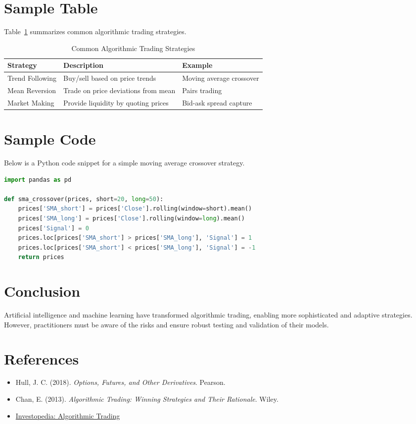 \documentclass[10pt,a4paper]{article} %
\begin{document}
\section{Sample Table}
Table~\ref{tab:strategies} summarizes common algorithmic trading strategies.

\begin{table}[h!]
\centering
\caption{Common Algorithmic Trading Strategies}
\label{tab:strategies}
\begin{tabular}{@{}lll@{}}
\toprule
Strategy & Description & Example \\
\midrule
Trend Following & Buy/sell based on price trends & Moving average crossover \\
Mean Reversion & Trade on price deviations from mean & Pairs trading \\
Market Making & Provide liquidity by quoting prices & Bid-ask spread capture \\
\bottomrule
\end{tabular}
\end{table}

\section{Sample Code}
Below is a Python code snippet for a simple moving average crossover strategy.

\begin{lstlisting}[language=Python, caption={Simple Moving Average Crossover}]
import pandas as pd

def sma_crossover(prices, short=20, long=50):
    prices['SMA_short'] = prices['Close'].rolling(window=short).mean()
    prices['SMA_long'] = prices['Close'].rolling(window=long).mean()
    prices['Signal'] = 0
    prices.loc[prices['SMA_short'] > prices['SMA_long'], 'Signal'] = 1
    prices.loc[prices['SMA_short'] < prices['SMA_long'], 'Signal'] = -1
    return prices
\end{lstlisting}

\section{Conclusion}
Artificial intelligence and machine learning have transformed algorithmic trading, enabling more sophisticated and adaptive strategies. However, practitioners must be aware of the risks and ensure robust testing and validation of their models.

\section{References}
\begin{itemize}
  \item Hull, J. C. (2018). \textit{Options, Futures, and Other Derivatives}. Pearson.
  \item Chan, E. (2013). \textit{Algorithmic Trading: Winning Strategies and Their Rationale}. Wiley.
  \item \href{https://www.investopedia.com/terms/a/algorithmictrading.asp}{Investopedia: Algorithmic Trading}
\end{itemize}
\end{document}
